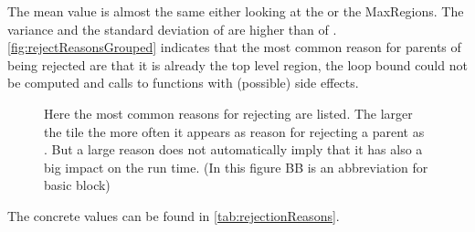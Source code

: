 The mean value is almost the same either looking at the \scops or the MaxRegions.
The variance and the standard deviation of \dyncovp are higher than of \dyncovs.\\
\autoref{fig:rejectReasonsGrouped} indicates that the most common reason for parents of \scops being rejected are that it is already the top level region, the loop bound could not be computed and calls to functions with (possible) side effects.
\begin{figure}[!h]
    \caption[Reasons for rejecting SCoPs]{
        Here the most common reasons for rejecting are listed.
        The larger the tile the more often it appears as reason for rejecting a parent as \scop.
        But a large reason does not automatically imply that it has also a big impact on the run time.
        (In this figure BB is an abbreviation for basic block)
    }
    
    \label{fig:rejectReasonsGrouped}
\end{figure}
The concrete values can be found in \autoref{tab:rejectionReasons}.

